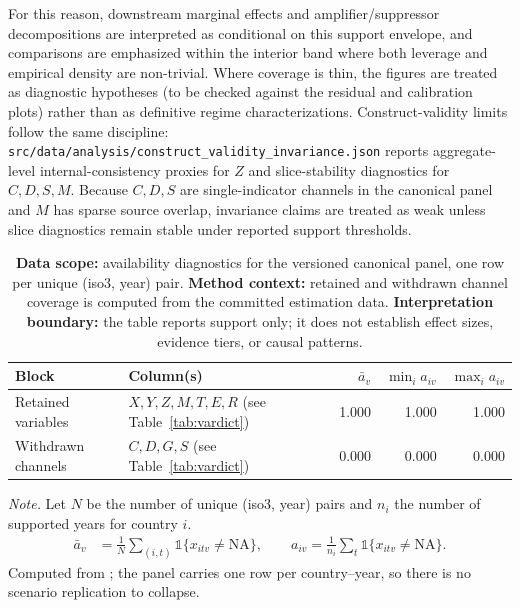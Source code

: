 \documentclass[11pt]{article}
\newcommand{\TableStyle}{%
    \small
    \setlength{\tabcolsep}{2pt}%
    \renewcommand{\arraystretch}{0.9}%
}
\newcommand{\TableNoteStyle}{\footnotesize}
\begin{document}
For this reason, downstream marginal effects and amplifier/suppressor decompositions are interpreted as conditional on this support envelope, and comparisons are emphasized within the interior band where both leverage and empirical density are non-trivial.
Where coverage is thin, the figures are treated as diagnostic hypotheses (to be checked against the residual and calibration plots) rather than as definitive regime characterizations.
Construct-validity limits follow the same discipline: \nolinkurl{src/data/analysis/construct_validity_invariance.json} reports aggregate-level internal-consistency proxies for $Z$ and slice-stability diagnostics for $C,D,S,M$. Because $C,D,S$ are single-indicator channels in the canonical panel and $M$ has sparse source overlap, invariance claims are treated as weak unless slice diagnostics remain stable under reported support thresholds.
\begin{table}[!t]
\centering
\TableStyle
\caption{\textbf{Data scope:} availability diagnostics for the versioned canonical panel, one row per unique (iso3, year) pair. \textbf{Method context:} retained and withdrawn channel coverage is computed from the committed estimation data. \textbf{Interpretation boundary:} the table reports support only; it does not establish effect sizes, evidence tiers, or causal patterns.}
\label{tab:missingness}
\begin{tabularx}{\linewidth}{@{}lXrrr@{}}
\toprule
Block & Column(s) & $\bar a_v$ & $\min_i a_{iv}$ & $\max_i a_{iv}$ \\
\midrule
Retained variables & $X,Y,Z,M,T,E,R$ (see Table~\ref{tab:vardict}) & 1.000 & 1.000 & 1.000 \\
Withdrawn channels & $C,D,G,S$ (see Table~\ref{tab:vardict}) & 0.000 & 0.000 & 0.000 \\
\bottomrule
\end{tabularx}

\vspace{0.25em}
\TableNoteStyle
\emph{Note.} Let $N$ be the number of unique (iso3, year) pairs and $n_i$ the number of supported years for country $i$.
\[
\begin{aligned}
\bar a_v &= \frac{1}{N}\sum_{(i,t)} \mathbb{1}\{x_{itv}\neq \mathrm{NA}\},
\qquad
a_{iv} = \frac{1}{n_i}\sum_{t} \mathbb{1}\{x_{itv}\neq \mathrm{NA}\}.
\end{aligned}
\]
Computed from ; the panel carries one row per country--year, so there is no scenario replication to collapse.
\end{table}
\end{document}
